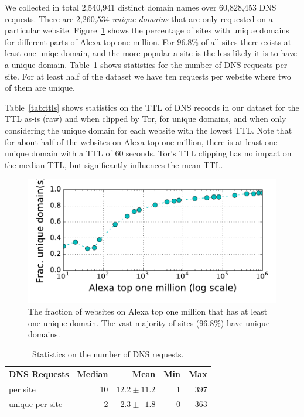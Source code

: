 We collected in total 2,540,941 distinct domain names over 60,828,453 DNS
requests. There are 2,260,534 \emph {unique domains} that are only requested on
a particular website. Figure~\ref{fig:unique-domains} shows the percentage of
sites with unique domains for different parts of Alexa top one million.
For 96.8\% of all sites there exists at least one uniqe domain, and the more
popular a site is the less likely it is to have a unique domain.
Table~\ref{tab:dns-requests} shows statistics for the number of DNS requests per
site. For at least half of the dataset we have ten requests per website where
two of them are unique.

Table~\ref{tab:ttls} shows statistics on the TTL of DNS records in our dataset
for the TTL as-is (raw) and when clipped by Tor, for unique domains, and when
only considering the unique domain for each website with the lowest TTL.
Note that for about half of the websites on Alexa top one million, there is at
least one unique domain with a TTL of 60 seconds. Tor's TTL clipping has no
impact on the median TTL, but significantly influences the mean TTL.

\begin{figure}[t]
	\centering
	\includegraphics[width=0.7\linewidth]{figures/dns-unique-domains.pdf}
	\caption{The fraction of websites on Alexa top one million that has at least
	one unique domain. The vast majority of sites (96.8\%) have unique domains.}
	\label{fig:unique-domains}
\end{figure}

\begin{table}[t]
	\centering
	\caption{Statistics on the number of DNS requests.}
	\begin{tabular}{l r r r r}
	\toprule
	\textbf{DNS Requests} & \textbf{Median} & \textbf{Mean} & \textbf{Min} & \textbf{Max} \\
	\midrule
	per site & 10 & $12.2\pm11.2$ & 1 & 397 \\
	unique per site & 2 & $2.3\pm\phantom{0}1.8$ & 0 & 363 \\
	\bottomrule
	\end{tabular}
	\label{tab:dns-requests}
\end{table}

